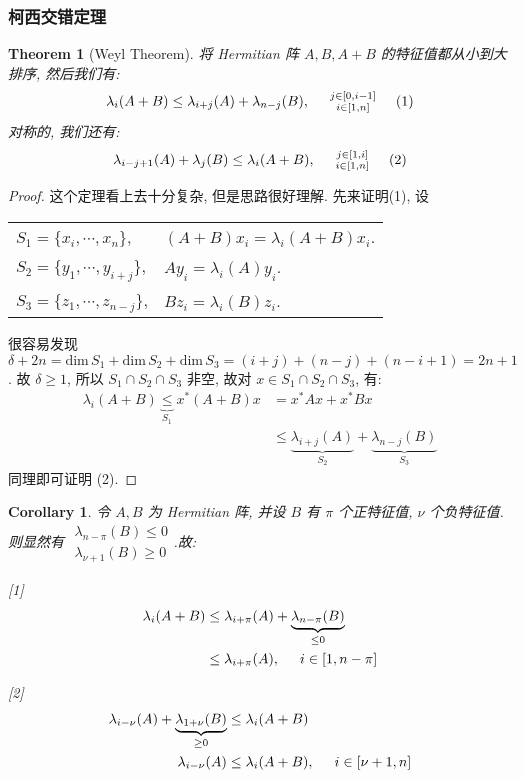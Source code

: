 \documentclass{article}
\newtheorem{theorem}{Theorem}
\newtheorem{corollary}{Corollary}
\def\dim{\mathrm{dim}\,}
\begin{document}
\subsubsection{柯西交错定理}
\begin{theorem}[Weyl Theorem]
  将 Hermitian 阵 $A, B, A+B$ 的特征值都从小到大排序, 然后我们有:
  \[\lambda_i(A + B) \leq \lambda_{i+j}(A) + \lambda_{n-j}(B), \hspace{0.5cm} \substack{j\in[0, i-1]\\i\in[1,n]}\hspace{0.5cm} (1)\]
  对称的, 我们还有:
  \[\lambda_{i-j+1}(A) + \lambda_j(B) \leq \lambda_i (A + B), \hspace{0.5cm} \substack{j\in[1, i]\\ i\in[1,n]} \hspace{0.5cm} (2)\]
\end{theorem}
\begin{proof}
  这个定理看上去十分复杂, 但是思路很好理解.
  先来证明(1), 设
  
  \begin{tabular}{ll}
    $S_1 = \{x_i, \cdots, x_n\}$, & $(A+B)x_i = \lambda_i(A+B)x_i$. \\
    $S_2 = \{y_1, \cdots, y_{i+j}\}$, & $Ay_i = \lambda_i(A)y_i$. \\
    $S_3 = \{z_1, \cdots, z_{n-j}\}$, & $Bz_i = \lambda_i(B)z_i$.
  \end{tabular}

  很容易发现 $\delta + 2n = \dim S_1 + \dim S_2 + \dim S_3 = (i+j) + (n-j) + (n-i+1) = 2n+1$.
  故 $\delta \geq 1$, 所以 $S_1 \cap S_2 \cap S_3$ 非空, 故对 $x\in S_1\cap S_2\cap S_3$, 有:
  \begin{align*}
    \lambda_i(A+B) \underbrace{\leq}_{S_1} x^*(A+B)x &= x^*Ax + x^*Bx \\
    &\leq \underbrace{\lambda_{i+j}(A)}_{S_2} + \underbrace{\lambda_{n-j}(B)}_{S_3}
  \end{align*}
  同理即可证明 (2).
\end{proof}

\begin{corollary}
  令 $A, B$ 为 Hermitian 阵, 并设 $B$ 有 $\pi$ 个正特征值, $\nu$ 个负特征值.
  则显然有 $\substack{\lambda_{n-\pi}(B) \leq 0 \\ \lambda_{\nu+1}(B) \geq 0}$.故:

  [1]
  \begin{align*}
    \lambda_i(A + B) &\leq \lambda_{i+\pi}(A) + \underbrace{\lambda_{n-\pi}(B)}_{\leq 0} \\
    &\leq \lambda_{i+\pi}(A), \hspace{0.5cm} i\in[1, n-\pi]
  \end{align*}

  [2]
  \begin{align*}
    \lambda_{i-\nu}(A) + \underbrace{\lambda_{1+\nu}(B)}_{\geq 0} &\leq \lambda_i(A+B) \\
    \lambda_{i-\nu}(A) &\leq \lambda_i(A+B), \hspace{0.5cm} i\in[\nu+1, n]
  \end{align*}
\end{corollary}
\end{document}
